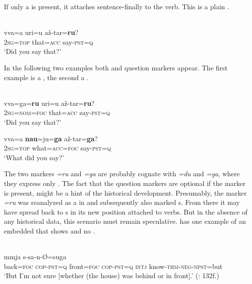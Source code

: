 \noindent If only a  is present, it attaches sentence-finally to the verb. This is a plain .

\ea%
    \label{ex:japa:42}
    \\
    \gll vva=a      uri=u    až-tar=\textbf{{ru}}?\\
    2\textsc{sg}=\textsc{top}    that=\textsc{acc}  say-\textsc{pst}=\textsc{q}\\
    \glt ‘Did you say that?’ \citep[119]{Shimoji2011a}
    \z

\noindent In the following two examples both  and question markers appear. The first example is a , the second a .

\newpage 
\ea%
    \label{ex:japa:43}
    \\
    \ea
    \gll vva=ga=\textbf{{ru}} uri=u    až-tar=\textbf{{ru}}?\\
    2\textsc{sg}=\textsc{nom}=\textsc{foc}  that=\textsc{acc}  say-\textsc{pst}=\textsc{q}\\
    \glt ‘Did you say that?’
    
    \ex
    \gll vva=a \textbf{{nau}}=ju=\textbf{{ga}} až-tar=\textbf{{ga}}?\\
    2\textsc{sg}=\textsc{top}  what=\textsc{acc}=\textsc{foc}  say-\textsc{pst}=\textsc{q}\\
    \glt ‘What did you say?’ \citep[118]{Shimoji2011a}
    \z
    \z

The two markers \textit{=ru} and \textit{=ga} are probably cognate with  \textit{=du} and \textit{=ga}, where they express only . The fact that the question markers are optional if the  marker is present, might be a hint of the historical development. Presumably, the  marker \textit{=ru} was reanalyzed as a  in   and subsequently also marked s. From there it may have spread back to s in its new position attached to verbs. But in the absence of any historical data, this scenario must remain speculative. \citet{Shimoji2011a} has one example of an embedded  that shows  and no .

\ea%
    \label{ex:japa:44}
    \\
    \gll [ssibara=\textbf{{ru}} a-tar=\textbf{{ru}} maibara=\textbf{{ru}} a-tar=\textbf{{ru}}] mmja  s-sa-n-Ø{=suga}\\
    back=\textsc{foc}  \textsc{cop}-\textsc{pst}=\textsc{q}  front=\textsc{foc}  \textsc{cop}-\textsc{pst}=\textsc{q} \textsc{intj}  know-\textsc{thm}-\textsc{neg}-\textsc{npst}=but\\
    \glt ‘But I’m not sure [whether (the house) was behind or in front].’ (\citealt{Shimoji2011a}: 132f.)
    \z

